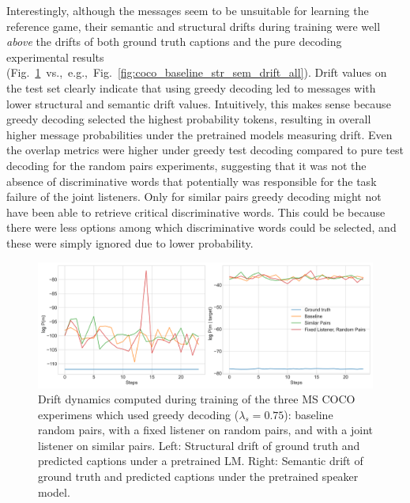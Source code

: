 Interestingly, although the messages seem to be unsuitable for learning the reference game, their semantic and structural drifts during training were well \emph{above} the drifts of both ground truth captions and the pure decoding experimental results (Fig.~\ref{fig:coco_greedy_drifts}~vs.,~e.g.,~Fig.~\ref{fig:coco_baseline_str_sem_drift_all}). Drift values on the test set clearly indicate that using greedy decoding led to messages with lower structural and semantic drift values. Intuitively, this makes sense because greedy decoding selected the highest probability tokens, resulting in overall higher message probabilities under the pretrained models measuring drift. Even the overlap metrics were higher under greedy test decoding compared to pure test decoding for the random pairs experiments, suggesting that it was not the absence of discriminative words that potentially was responsible for the task failure of the joint listeners. Only for similar pairs greedy decoding might not have been able to retrieve critical discriminative words. This could be because there were less options among which discriminative words could be selected, and these were simply ignored due to lower probability.
\begin{figure}
	\centering
	\includegraphics[width=\linewidth]{images/coco_structural_semantic_drift_greedy_all_4000_pure_075.png}
	\caption{Drift dynamics computed during training of the three MS COCO experimens which used greedy decoding ($\lambda_s = 0.75$): baseline random pairs, with a fixed listener on random pairs, and with a joint listener on similar pairs. Left: Structural drift of ground truth and predicted captions under a pretrained LM. Right: Semantic drift of ground truth and predicted captions under the pretrained speaker model.}
	\label{fig:coco_greedy_drifts}
\end{figure} 

